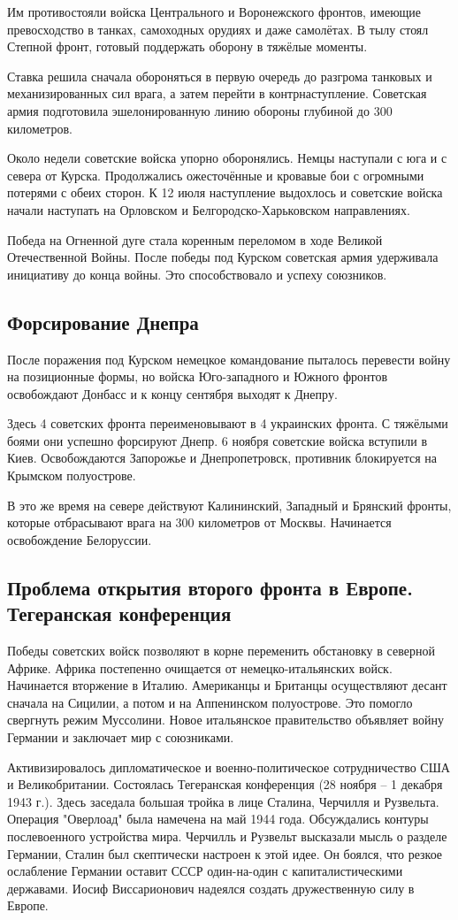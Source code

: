 Им противостояли войска Центрального и Воронежского фронтов, имеющие превосходство в танках, самоходных орудиях и даже самолётах. В тылу стоял Степной фронт, готовый поддержать оборону в тяжёлые моменты.

Ставка решила сначала обороняться в первую очередь до разгрома танковых и механизированных сил врага, а затем перейти в контрнаступление. Советская армия подготовила эшелонированную линию обороны глубиной до 300 километров.

Около недели советские войска упорно оборонялись. Немцы наступали с юга и с севера от Курска. Продолжались ожесточённые и кровавые бои с огромными потерями с обеих сторон. К 12 июля наступление выдохлось и советские войска начали наступать на Орловском и Белгородско-Харьковском направлениях.

Победа на Огненной дуге стала коренным переломом в ходе Великой Отечественной Войны. После победы под Курском советская армия удерживала инициативу до конца войны. Это способствовало и успеху союзников.

\subsection{Форсирование Днепра}

После поражения под Курском немецкое командование пыталось перевести войну на позиционные формы, но  войска Юго-западного и Южного фронтов освобождают Донбасс и к концу сентября выходят к Днепру.

Здесь 4 советских фронта переименовывают в 4 украинских фронта. С тяжёлыми боями они успешно форсируют Днепр. 6 ноября советские войска вступили в Киев. Освобождаются Запорожье и Днепропетровск, противник блокируется на Крымском полуострове.

В это же время на севере действуют Калининский, Западный и Брянский фронты, которые отбрасывают врага на  300 километров от Москвы. Начинается освобождение Белоруссии.

\subsection{Проблема открытия второго фронта в Европе. Тегеранская конференция}

Победы советских войск позволяют в корне переменить обстановку в северной Африке. Африка постепенно очищается от немецко-итальянских войск. Начинается вторжение в Италию. Американцы и Британцы осуществляют десант сначала на Сицилии, а потом и на Аппенинском полуострове. Это помогло свергнуть режим Муссолини. Новое итальянское правительство объявляет войну Германии и заключает мир с союзниками.

Активизировалось дипломатическое и военно-политическое сотрудничество США и Великобритании. Состоялась Тегеранская конференция (28 ноября -- 1 декабря 1943 г.). Здесь заседала большая тройка в лице Сталина, Черчилля и Рузвельта. Операция "Оверлоад" была намечена на май 1944 года. Обсуждались контуры послевоенного устройства мира. Черчилль и Рузвельт высказали мысль о разделе Германии, Сталин был скептически настроен к этой идее. Он боялся, что резкое ослабление Германии оставит СССР один-на-один с капиталистическими державами. Иосиф Виссарионович надеялся создать дружественную силу в Европе.

